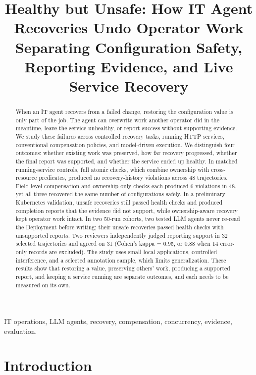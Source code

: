 \documentclass[conference,10pt]{IEEEtran}
\title{Healthy but Unsafe: How IT Agent Recoveries Undo Operator Work\\[0.3em]{\large Separating Configuration Safety, Reporting Evidence, and Live Service Recovery}}
\author{\IEEEauthorblockN{Santosh Sibyala}\IEEEauthorblockA{ORCID: 0009-0000-5970-4166\\santoshsibyala@gmail.com}}
\begin{document}
\maketitle


\begin{abstract}

When an IT agent recovers from a failed change, restoring the configuration value is only part of the job. The agent can overwrite work another operator did in the meantime, leave the service unhealthy, or report success without supporting evidence. We study these failures across controlled recovery tasks, running HTTP services, conventional compensation policies, and model\hyp{}driven execution. We distinguish four outcomes: whether existing work was preserved, how far recovery progressed, whether the final report was supported, and whether the service ended up healthy. In matched running\hyp{}service controls, full atomic checks, which combine ownership with cross\hyp{}resource predicates, produced no recovery\hyp{}history violations across 48 trajectories. Field\hyp{}level compensation and ownership\hyp{}only checks each produced 6 violations in 48, yet all three recovered the same number of configurations safely. In a preliminary Kubernetes validation, unsafe recoveries still passed health checks and produced completion reports that the evidence did not support, while ownership\hyp{}aware recovery kept operator work intact. In two 50-run cohorts, two tested LLM agents never re\hyp{}read the Deployment before writing; their unsafe recoveries passed health checks with unsupported reports. Two reviewers independently judged reporting support in 32 selected trajectories and agreed on 31 (Cohen's kappa = 0.95, or 0.88 when 14 error\hyp{}only records are excluded). The study uses small local applications, controlled interference, and a selected annotation sample, which limits generalization. These results show that restoring a value, preserving others' work, producing a supported report, and keeping a service running are separate outcomes, and each needs to be measured on its own.

\end{abstract}

\begin{IEEEkeywords}

IT operations, LLM agents, recovery, compensation, concurrency, evidence, evaluation.

\end{IEEEkeywords}

\section{Introduction}
\end{document}
